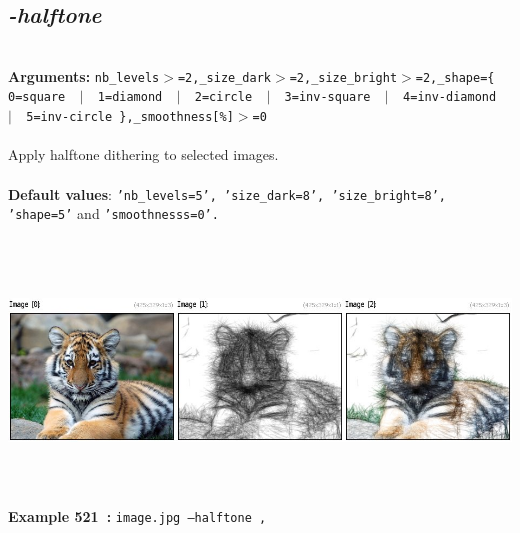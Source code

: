 \documentclass[a4paper,11pt,twoside]{book}
\begin{document}
\subsection{\emph{-halftone} }\vspace*{-0.5em}
~\\\textbf{Arguments: } 
{\small \texttt{nb\_levels$>$=2,\_size\_dark$>$=2,\_size\_bright$>$=2,\_shape=\{ 0=square ~$|$~ 1=diamond ~$|$~ 2=circle ~$|$~ 3=inv-square ~$|$~ 4=inv-diamond ~$|$~ 5=inv-circle \},\_smoothness[\%]$>$=0}}\\~\\
Apply halftone dithering to selected images.
~\\~\\\textbf{Default values}: {\small \texttt{'nb\_levels=5', 'size\_dark=8', 'size\_bright=8', 'shape=5'} and \texttt{'smoothnesss=0'.}}
\begin{center}\includegraphics[keepaspectratio=true,height=7cm,width=\textwidth]{img/gmic_def521.jpg}\\
{\footnotesize \textbf{Example 521~:} \texttt{image.jpg --halftone ,}}
\end{center}
\end{document}
